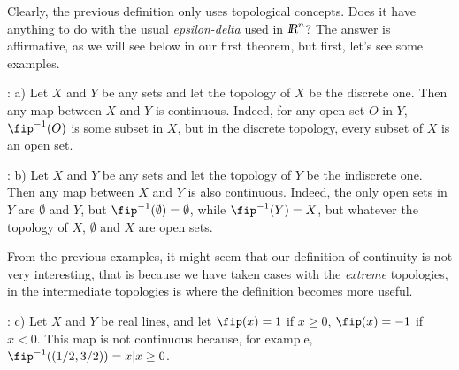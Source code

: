 
\espa

Clearly, the previous definition only uses topological concepts. Does it have anything to do with the usual {\sl epsilon-delta} used in $\mbox{\sl {l$\!\!\!\;\:\!$R}}^n$? The answer is affirmative, as we will see below in our first theorem, but first, let's see some examples.

\ejem: a) Let $X$ and $Y$ be any sets and let the topology of $X$ be the discrete one. Then any map between $X$ and $Y$ is continuous. Indeed, for any open set $O$ in $Y$, $\fip^{-1}(O)$ is some subset in $X$, but in the discrete topology, every subset of $X$ is an open set.

\ejem: b) Let $X$ and $Y$ be any sets and let the topology of $Y$ be the indiscrete one. Then any map between $X$ and $Y$ is also continuous. Indeed, the only open sets in $Y$ are $\emptyset$ and $Y$, but $\fip^{-1}(\emptyset) = \emptyset$, while $\fip^{-1}(Y)=X$, but whatever the topology of $X$, $\emptyset$ and $X$ are open sets.

From the previous examples, it might seem that our definition of continuity is not very interesting, that is because we have taken cases with the {\sl extreme} topologies, in the intermediate topologies is where the definition becomes more useful.

\ejem: c) Let $X$ and $Y$ be real lines, and let $\fip(x) = 1$ if $x \geq 0$, $\fip(x) = -1$ if $x < 0$. This map is not continuous because, for example, $\fip^{-1}((1/2,3/2)) = {x | x \geq 0}$.

